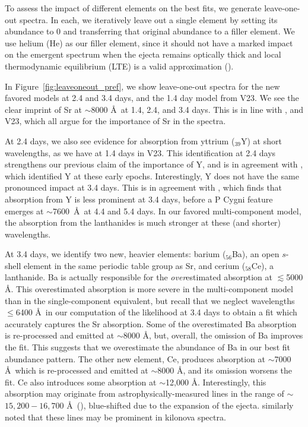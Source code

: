 \documentclass[twocolumn,twocolappendix]{aastex63}
\begin{document}
To assess the impact of different elements on the best fits, we generate leave-one-out spectra. In each, we iteratively leave out a single element by setting its abundance to 0 and transferring that original abundance to a filler element. We use helium (He) as our filler element, since it should not have a marked impact on the emergent spectrum when the ejecta remains optically thick and local thermodynamic equilibrium (LTE) is a valid approximation (\citealt{perego22, tarumi23}).

In Figure~\ref{fig:leaveoneout_pref}, we show leave-one-out spectra for the new favored models at 2.4 and 3.4 days, and the 1.4 day model from V23. We see the clear imprint of Sr at $\sim$8000 \AA~at 1.4, 2.4, and 3.4 days. This is in line with \cite{watson19, gillanders22, domoto21, domoto22, sneppen23, sneppenwatson23}, and V23, which all argue for the importance of Sr in the spectra. 

At 2.4 days, we also see evidence for absorption from yttrium (${}_{39}$Y) at short wavelengths, as we have at 1.4 days in V23. This identification at 2.4 days strengthens our previous claim of the importance of Y, and is in agreement with \cite{gillanders22}, which identified Y at these early epochs. Interestingly, Y does not have the same pronounced impact at 3.4 days. This is in agreement with \cite{sneppenwatson23}, which finds that absorption from Y is less prominent at 3.4 days, before a P Cygni feature emerges at $\sim$7600~\AA~at 4.4 and 5.4 days. In our favored multi-component model, the absorption from the lanthanides is much stronger at these (and shorter) wavelengths. 

At 3.4 days, we identify two new, heavier elements: barium (${}_{56}$Ba), an open $s$-shell element in the same periodic table group as Sr, and cerium (${}_{58}$Ce), a lanthanide. Ba is actually responsible for the \textit{over}estimated absorption at $\lesssim$5000 \AA. This overestimated absorption is more severe in the multi-component model than in the single-component equivalent, but recall that we neglect wavelengths $\leqslant$6400 \AA~in our computation of the likelihood at 3.4 days to obtain a fit which accurately captures the Sr absorption. Some of the overestimated Ba absorption is re-processed and emitted at $\sim$8000 \AA, but, overall, the omission of Ba improves the fit. This suggests that we overestimate the abundance of Ba in our best fit abundance pattern. The other new element, Ce, produces absorption at $\sim$7000 \AA~which is re-processed and emitted at $\sim$8000 \AA, and its omission worsens the fit. Ce also introduces some absorption at $\sim$12,000 \AA. Interestingly, this absorption may originate from astrophysically-measured  lines in the range of $\sim$$15,200 - 16,700$ \AA~(\citealt{cunha17, majewski17}), blue-shifted due to the expansion of the ejecta. \cite{domoto21} similarly noted that these  lines may be prominent in kilonova spectra.
\end{document}
